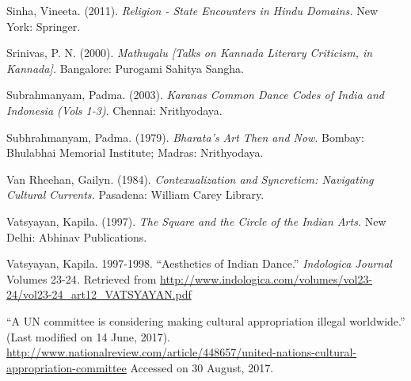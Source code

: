 \begin{thebibliography}{99}
  Sinha, Vineeta. (2011). \textit{Religion - State Encounters in Hindu Domains.} New York: Springer.

  Srinivas, P. N. (2000). \textit{Mathugalu [Talks on Kannada Literary Criticism, in Kannada].} Bangalore: Purogami Sahitya Sangha.

  Subrahmanyam, Padma. (2003). \textit{Karanas Common Dance Codes of India and Indonesia (Vols 1-3)}. Chennai: Nrithyodaya.

  Subhrahmanyam, Padma. (1979). \textit{Bharata’s Art Then and Now}. Bombay: Bhulabhai Memorial Institute; Madras: Nrithyodaya.

  Van Rheehan, Gailyn. (1984). \textit{Contexualization and Syncreticm: Navigating Cultural Currents.} Pasadena: William Carey Library.

  Vatsyayan, Kapila. (1997). \textit{The Square and the Circle of the Indian Arts.} New Delhi: Abhinav Publications.

  Vatsyayan, Kapila. 1997-1998. “Aesthetics of Indian Dance.” \textit{Indologica Journal }Volumes 23-24\textit{. }Retrieved from \url{http://www.indologica.com/volumes/vol23-24/vol23-24_art12_VATSYAYAN.pdf}

  “A UN committee is considering making cultural appropriation illegal worldwide.” (Last modified on 14 June, 2017). \url{http://www.nationalreview.com/article/448657/united-nations-cultural-appropriation-committee} Accessed on 30 August, 2017.

 \end{thebibliography}

